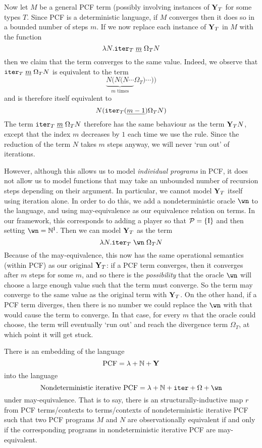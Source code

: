 \documentclass{article}
\begin{document}
Now let $M$ be a general PCF term (possibly involving instances of $\mathbf{Y}_T$ for some types $T$.  Since PCF is a deterministic language, if $M$ converges then it does so in a bounded number of steps $m$.  If we now replace each instance of $\mathbf{Y}_T$ in $M$ with the function
\[
  \lambda N.{\mathtt{iter}}_T\;{\underline{m}}\;\Omega_T N
  \]
then we claim that the term converges to the same value.  Indeed, we observe that ${\mathtt{iter}}_T\;{\underline{m}}\;\Omega_T N$ is equivalent to the term
\[
  \underbrace{N (N (N \cdots}_{m\text{ times}}\Omega_T)\cdots))
  \]
and is therefore itself equivalent to
\[
  N({\mathtt{iter}}_T ({\underline{m-1}})\Omega_T N)
  \]
The term ${\mathtt{iter}}_T\;{\underline{m}}\;\Omega_T N$ therefore has the same behaviour as the term $\mathbf{Y}_T N$, except that the index $m$ decreases by $1$ each time we use the rule.  
Since the reduction of the term $N$ takes $m$ steps anyway, we will never `run out' of iterations.

However, although this allows us to model \emph{individual programs} in PCF, it does not allow us to model functions that may take an unbounded number of recursion steps depending on their argument.  
In particular, we cannot model $\mathbf{Y}_T$ itself using iteration alone.  
In order to do this, we add a nondeterministic oracle $\wn$ to the language, and using may-equivalence as our equivalence relation on terms.  
In our framework, this corresponds to adding a player so that $\P=\{\RN{1}\}$ and then setting $\wn = \mathbb N^{\RN{1}}$.
Then we can model $\mathbf{Y}_T$ as the term
\[
  \lambda N.\iter_T\;\wn\;\Omega_T N
  \]
Because of the may-equivalence, this now has the same operational semantics (within PCF) as our original $\mathbf{Y}_T$: if a PCF term converges, then it converges after $m$ steps for some $m$, and so there is the \emph{possibility} that the oracle $\wn$ will choose a large enough value such that the term must converge.  
So the term may converge to the same value as the original term with $\mathbf{Y}_T$.  
On the other hand, if a PCF term diverges, then there is no number we could replace the $\wn$ with that would cause the term to converge.  
In that case, for every $m$ that the oracle could choose, the term will eventually `run out' and reach the divergence term $\Omega_T$, at which point it will get stuck.

\begin{theorem}
  There is an embedding of the language
  \[
    \text{PCF} = \lambda + \mathbb N + \mathbf{Y}
    \]
  into the language
  \[
    \text{Nondeterministic iterative PCF} = \lambda + \mathbb N + \iter + \Omega + \wn
    \]
  under may-equivalence.  
  That is to say, there is an structurally-inductive map $r$ from PCF terms/contexts to terms/contexts of nondeterministic iterative PCF such that two PCF programs $M$ and $N$ are observationally equivalent if and only if the corresponding programs in nondeterministic iterative PCF are may-equivalent.
\end{theorem}
\end{document}
